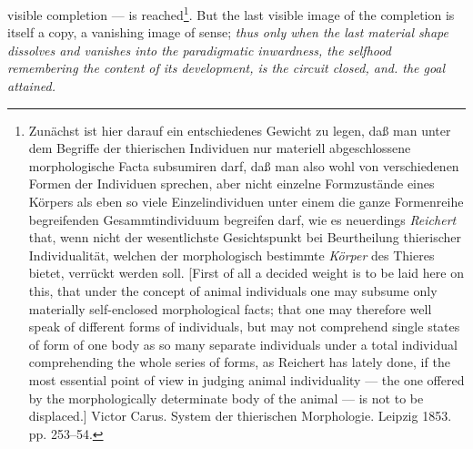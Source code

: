 \documentclass[12pt,a4paper]{book}
\begin{document}
\setcounter{footnote}{0}
visible completion --- is reached\footnote{Zunächst ist hier darauf ein
entschiedenes Gewicht zu legen, daß man unter dem Begriffe der thierischen
Individuen nur materiell abgeschlossene morphologische Facta subsumiren darf, daß
man also wohl von verschiedenen Formen der Individuen sprechen, aber nicht
einzelne Formzustände eines Körpers als eben so viele Einzelindividuen unter
einem die ganze Formenreihe begreifenden Gesammtindividuum begreifen darf, wie es
neuerdings \emph{Reichert} that, wenn nicht der wesentlichste Gesichtspunkt bei
Beurtheilung thierischer Individualität, welchen der morphologisch bestimmte
\emph{Körper} des Thieres bietet, verrückt werden soll. [First of all a decided
weight is to be laid here on this, that under the concept of animal individuals
one may subsume only materially self-enclosed morphological facts; that one may
therefore well speak of different forms of individuals, but may not comprehend
single states of form of one body as so many separate individuals under a total
individual comprehending the whole series of forms, as Reichert has lately done,
if the most essential point of view in judging animal individuality --- the one
offered by the morphologically determinate body of the animal --- is not to be
displaced.] Victor Carus. System der thierischen Morphologie. Leipzig 1853.
pp. 253--54.}. But the last visible image of the completion is itself a copy, a
vanishing image of sense; \emph{thus only when the last material shape dissolves
and vanishes into the paradigmatic inwardness, the selfhood remembering the
content of its development, is the circuit closed, and. the goal attained.}
\end{document}
